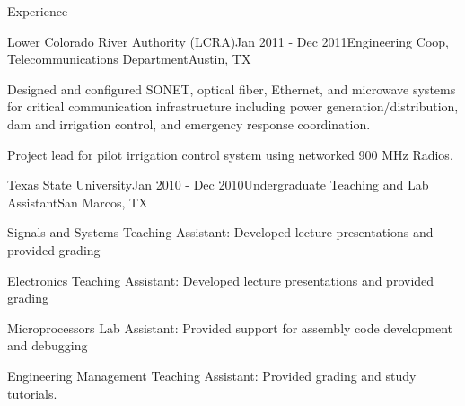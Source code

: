 \documentclass{resume} %
\begin{document}
\begin{rSection}{Experience}

\begin{rSubsection}{Lower Colorado River Authority (LCRA)}{Jan 2011 - Dec 2011}{Engineering Coop, Telecommunications Department}{Austin, TX}
\item{Designed and configured SONET, optical fiber, Ethernet, and microwave systems for critical communication infrastructure including power generation/distribution, dam and 
            irrigation control, and emergency response coordination. }
\item{Project lead for pilot irrigation control system using networked 900 MHz Radios.}
\end{rSubsection}

\begin{rSubsection}{Texas State University}{Jan 2010 - Dec 2010}{Undergraduate Teaching and Lab Assistant}{San Marcos, TX}
\item{Signals and Systems Teaching Assistant: Developed lecture presentations and provided grading}
\item{Electronics Teaching Assistant: Developed lecture presentations and provided grading}
\item{Microprocessors Lab Assistant: Provided support for assembly code development and debugging}
\item{Engineering Management Teaching Assistant: Provided grading and study tutorials.}
\end{rSubsection}
\end{rSection}
\end{document}
